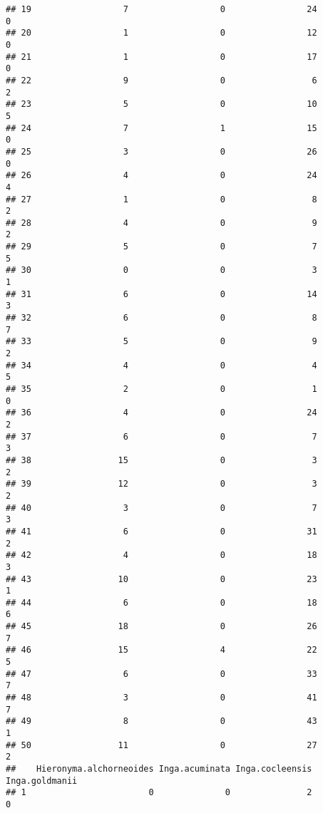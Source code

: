 \documentclass[
]{article}
\begin{document}
\begin{verbatim}
## 19                  7                  0                24              0
## 20                  1                  0                12              0
## 21                  1                  0                17              0
## 22                  9                  0                 6              2
## 23                  5                  0                10              5
## 24                  7                  1                15              0
## 25                  3                  0                26              0
## 26                  4                  0                24              4
## 27                  1                  0                 8              2
## 28                  4                  0                 9              2
## 29                  5                  0                 7              5
## 30                  0                  0                 3              1
## 31                  6                  0                14              3
## 32                  6                  0                 8              7
## 33                  5                  0                 9              2
## 34                  4                  0                 4              5
## 35                  2                  0                 1              0
## 36                  4                  0                24              2
## 37                  6                  0                 7              3
## 38                 15                  0                 3              2
## 39                 12                  0                 3              2
## 40                  3                  0                 7              3
## 41                  6                  0                31              2
## 42                  4                  0                18              3
## 43                 10                  0                23              1
## 44                  6                  0                18              6
## 45                 18                  0                26              7
## 46                 15                  4                22              5
## 47                  6                  0                33              7
## 48                  3                  0                41              7
## 49                  8                  0                43              1
## 50                 11                  0                27              2
##    Hieronyma.alchorneoides Inga.acuminata Inga.cocleensis Inga.goldmanii
## 1                        0              0               2              0

\end{verbatim}
\end{document}
